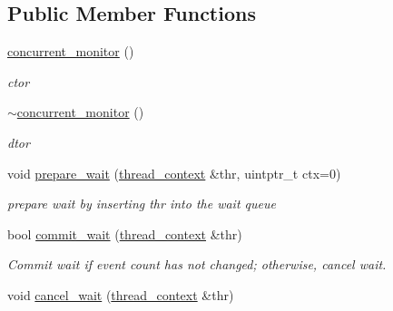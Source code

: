 \subsection*{Public Member Functions}
\begin{DoxyCompactItemize}
\item 
\hypertarget{classtbb_1_1internal_1_1concurrent__monitor_a89acc7c175da53177dc5eb32c419a658}{}\hyperlink{classtbb_1_1internal_1_1concurrent__monitor_a89acc7c175da53177dc5eb32c419a658}{concurrent\+\_\+monitor} ()\label{classtbb_1_1internal_1_1concurrent__monitor_a89acc7c175da53177dc5eb32c419a658}

\begin{DoxyCompactList}\small\item\em ctor \end{DoxyCompactList}\item 
\hypertarget{classtbb_1_1internal_1_1concurrent__monitor_afa5d41039e34cf954626ae1d55d4386e}{}\hyperlink{classtbb_1_1internal_1_1concurrent__monitor_afa5d41039e34cf954626ae1d55d4386e}{$\sim$concurrent\+\_\+monitor} ()\label{classtbb_1_1internal_1_1concurrent__monitor_afa5d41039e34cf954626ae1d55d4386e}

\begin{DoxyCompactList}\small\item\em dtor \end{DoxyCompactList}\item 
\hypertarget{classtbb_1_1internal_1_1concurrent__monitor_a87e8231d37c0875953fc2283c1158115}{}void \hyperlink{classtbb_1_1internal_1_1concurrent__monitor_a87e8231d37c0875953fc2283c1158115}{prepare\+\_\+wait} (\hyperlink{classtbb_1_1internal_1_1concurrent__monitor_1_1thread__context}{thread\+\_\+context} \&thr, uintptr\+\_\+t ctx=0)\label{classtbb_1_1internal_1_1concurrent__monitor_a87e8231d37c0875953fc2283c1158115}

\begin{DoxyCompactList}\small\item\em prepare wait by inserting \textquotesingle{}thr\textquotesingle{} into the wait queue \end{DoxyCompactList}\item 
bool \hyperlink{classtbb_1_1internal_1_1concurrent__monitor_adb7065c781c2ae5f76d602c184c5194e}{commit\+\_\+wait} (\hyperlink{classtbb_1_1internal_1_1concurrent__monitor_1_1thread__context}{thread\+\_\+context} \&thr)
\begin{DoxyCompactList}\small\item\em Commit wait if event count has not changed; otherwise, cancel wait. \end{DoxyCompactList}\item 
\hypertarget{classtbb_1_1internal_1_1concurrent__monitor_ab6e8b88bc5de74f5f872d18de94978f2}{}void \hyperlink{classtbb_1_1internal_1_1concurrent__monitor_ab6e8b88bc5de74f5f872d18de94978f2}{cancel\+\_\+wait} (\hyperlink{classtbb_1_1internal_1_1concurrent__monitor_1_1thread__context}{thread\+\_\+context} \&thr)\label{classtbb_1_1internal_1_1concurrent__monitor_ab6e8b88bc5de74f5f872d18de94978f2}


\end{DoxyCompactItemize}
